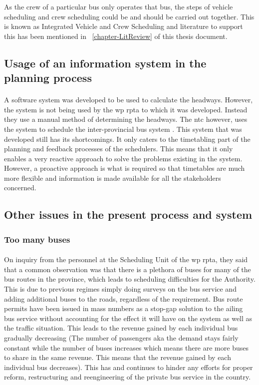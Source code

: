 As the crew of a particular bus only operates that bus, the steps of vehicle scheduling and crew scheduling could be and should be carried out together. This is known as Integrated Vehicle and Crew Scheduling and literature to support this has been mentioned in ~\ref{chapter-LitReview} of this thesis document.

\subsection{Usage of an information system in the planning process}

\paragraph{ } A software system was developed to be used to calculate the headways. However, the system is not being used by the \acrshort{wp} \acrshort{rpta} to which it was developed. Instead they use a manual method of determining the headways. The \acrshort{ntc} however, uses the system to schedule the inter-provincial bus system \cite{Piyadasa2013}. This system that was developed still has its shortcomings. It only caters to the timetabling part of the planning and feedback processes of the schedulers. This means that it only enables a very reactive approach to solve the problems existing in the system. However, a proactive approach is what is required so that timetables are much more flexible and information is made available for all the stakeholders concerned.

\subsection{Other issues in the present process and system}

\subsubsection{Too many buses} 

\paragraph{} On inquiry from the personnel at the Scheduling Unit of the \acrshort{wp} \acrshort{rpta}, they said that a common observation was that there is a plethora of buses for many of the bus routes in the province, which leads to scheduling difficulties for the Authority. This is due to previous regimes simply doing surveys on the bus service and adding additional buses to the roads, regardless of the requirement. Bus route permits have been issued in mass numbers as a stop-gap solution to the ailing bus service without accounting for the effect it will have on the system as well as the traffic situation. This leads to the revenue gained by each individual bus gradually decreasing (The number of passengers aka the demand stays fairly constant while the number of buses increases which means there are more buses to share in the same revenue. This means that the revenue gained by each individual bus decreases). This has and continues to hinder any efforts for proper reform, restructuring and reengineering of the private bus service in the country.

